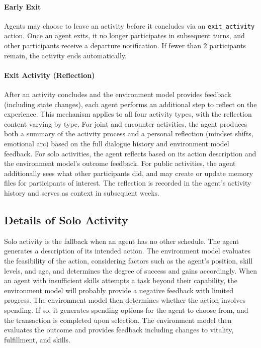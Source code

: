 \paragraph{Early Exit}
Agents may choose to leave an activity before it concludes via an \texttt{exit\_activity} action.
Once an agent exits, it no longer participates in subsequent turns, and other participants receive a departure notification.
If fewer than 2 participants remain, the activity ends automatically.

\paragraph{Exit Activity (Reflection)}
After an activity concludes and the environment model provides feedback (including state changes), each agent performs an additional step to reflect on the experience.
This mechanism applies to all four activity types, with the reflection content varying by type.
For joint and encounter activities, the agent produces both a summary of the activity process and a personal reflection (mindset shifts, emotional arc) based on the full dialogue history and environment model feedback.
For solo activities, the agent reflects based on its action description and the environment model's outcome feedback.
For public activities, the agent additionally sees what other participants did, and may create or update memory files for participants of interest.
The reflection is recorded in the agent's activity history and serves as context in subsequent weeks.

\subsection{Details of Solo Activity}
\label{sec:appendix_solo_activity}

Solo activity is the fallback when an agent has no other schedule. The agent generates a description of its intended action.
The environment model evaluates the feasibility of the action, considering factors such as the agent's position, skill levels, and age, and determines the degree of success and gains accordingly.
When an agent with insufficient skills attempts a task beyond their capability, the environment model will probably provide a negative feedback with limited progress.
The environment model then determines whether the action involves spending. If so, it generates spending options for the agent to choose from, and the transaction is completed upon selection.
The environment model then evaluates the outcome and provides feedback including changes to vitality, fulfillment, and skills.

